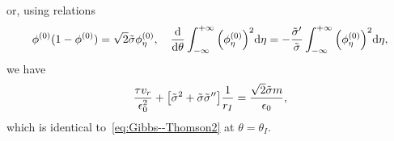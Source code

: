 \documentclass{article}
\begin{document}
or, using relations
\begin{equation}\label{eq:phi0_relations}
    \phi^{(0)}(1-\phi^{(0)}) = \sqrt2\tilde\sigma\phi^{(0)}_\eta, \quad
    \dv{\theta}\int_{-\infty}^{+\infty} \qty(\phi^{(0)}_\eta)^2 \dd\eta =
        -\frac{\tilde\sigma'}{\tilde\sigma}\int_{-\infty}^{+\infty} \qty(\phi^{(0)}_\eta)^2 \dd\eta,
\end{equation}
we have
\begin{equation}\label{eq:phi1_solvability2}
    \frac{\tau v_r}{\epsilon_0^2} + \qty[\tilde\sigma^2 + \tilde\sigma\tilde\sigma'']\frac1{r_I} =
        \frac{\sqrt2\tilde\sigma m}{\epsilon_0},
\end{equation}
which is identical to~\eqref{eq:Gibbs--Thomson2} at $\theta=\theta_I$.

\printbibliography
\end{document}
